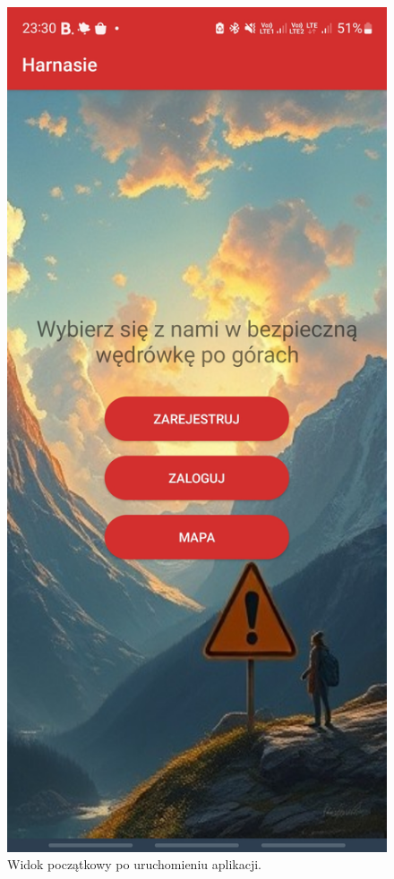\begin{figure}[H]
    \centering
    \includegraphics[scale=0.15]{img/imp/widok-home.jpg}
    \caption{Widok początkowy po uruchomieniu aplikacji.}
    \label{widok:home}
\end{figure}
